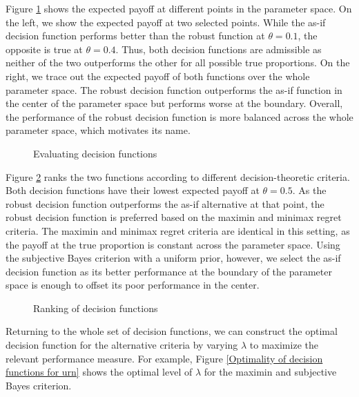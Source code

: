 Figure \ref{Measurement of performance} shows the expected payoff at different points in the parameter space. On the left, we show the expected payoff at two selected points. While the as-if decision function performs better than the robust function at $\theta = 0.1$, the opposite is true at $\theta = 0.4$. Thus, both decision functions are admissible as neither of the two outperforms the other for all possible true proportions. On the right, we trace out the expected payoff of both functions over the whole parameter space. The robust decision function outperforms the as-if function in the center of the parameter space but performs worse at the boundary. Overall, the performance of the robust decision function is more balanced across the whole parameter space, which motivates its name.

\begin{figure}[h!]\centering
{}\hspace{0.3cm}
\caption{Evaluating decision functions}\label{Measurement of performance}
\end{figure}\FloatBarrier

Figure \ref{Ranking of decision functions} ranks the two functions according to different decision-theoretic criteria. Both decision functions have their lowest expected payoff at $\theta = 0.5$. As the robust decision function outperforms the as-if alternative at that point, the robust decision function is preferred based on the maximin and minimax regret criteria. The maximin and minimax regret criteria are identical in this setting, as the payoff at the true proportion is constant across the parameter space.   Using the subjective Bayes criterion with a uniform prior, however, we select the as-if decision function as its better performance at the boundary of the parameter space is enough to offset its poor performance in the center.

\begin{figure}[h!]\centering
{}
\caption{Ranking of decision functions}\label{Ranking of decision functions}
\end{figure}\FloatBarrier

Returning to the whole set of decision functions, we can construct the optimal decision function for the alternative criteria by varying $\lambda$ to maximize the relevant performance measure. For example, Figure \ref{Optimality of decision functions for urn} shows the optimal level of $\lambda$ for the maximin and subjective Bayes criterion.

